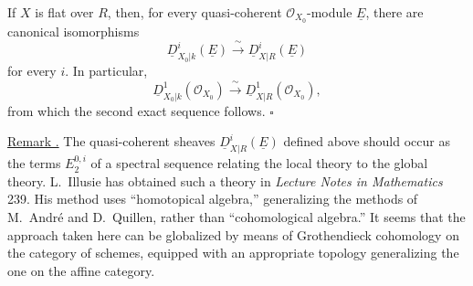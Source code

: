 If $X$ is flat over $R$, then, for every quasi-coherent
$\mathcal O_{X_0}$-module $\underline E$, there are canonical
isomorphisms
\[
 \underline D^i_{X_0|k}(\underline E)
 \xrightarrow{\ \sim\ }
 \underline D^i_{X|R}(\underline E)
\]
for every $i$. In particular,
\[
 \underline D^1_{X_0|k}(\mathcal O_{X_0})
 \xrightarrow{\ \sim\ }
 \underline D^1_{X|R}(\mathcal O_{X_0}),
\]
from which the second exact sequence follows.
\hfill$\square$

\underline{Remark .}
The quasi-coherent sheaves $\underline D^i_{X|R}(\underline E)$
defined above should occur as the terms $E_2^{0,i}$ of a spectral
sequence relating the local theory to the global theory. L.~Illusie
has obtained such a theory in \emph{Lecture Notes in Mathematics}
239. His method uses ``homotopical algebra,'' generalizing the methods
of M.~André and D.~Quillen, rather than ``cohomological algebra.'' It
seems that the approach taken here can be globalized by means of
Grothendieck cohomology on the category of schemes, equipped with an
appropriate topology generalizing the one on the affine category.
